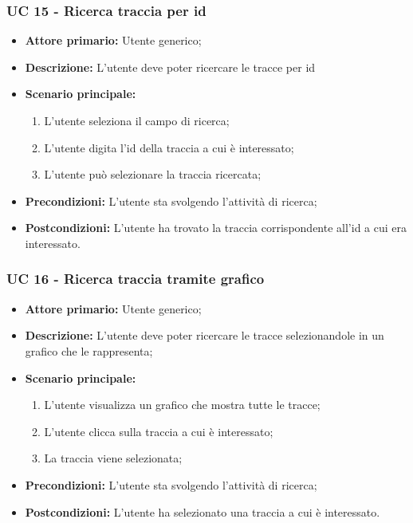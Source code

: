 \subsubsection{UC 15 - Ricerca traccia per id}
\begin{itemize}
	\item \textbf{Attore primario:} Utente generico;
	\item \textbf{Descrizione:} L'utente deve poter ricercare le tracce per id
	\item \textbf{Scenario principale:} 
		\begin{enumerate}
			\item L'utente seleziona il campo di ricerca;
			\item L'utente digita l'id della traccia a cui è interessato;
			\item L'utente può selezionare la traccia ricercata;
		\end{enumerate}
	\item \textbf{Precondizioni:} L'utente sta svolgendo l'attività di ricerca;
	\item \textbf{Postcondizioni:} L'utente ha trovato la traccia corrispondente all'id a cui era interessato.
\end{itemize}

\subsubsection{UC 16 - Ricerca traccia tramite grafico}
\begin{itemize}
	\item \textbf{Attore primario:} Utente generico;
	\item \textbf{Descrizione:} L'utente deve poter ricercare le tracce selezionandole in un grafico che le rappresenta; 
	\item \textbf{Scenario principale:} 
		\begin{enumerate}
			\item L'utente visualizza un grafico che mostra tutte le tracce;
			\item L'utente clicca sulla traccia a cui è interessato;
			\item La traccia viene selezionata;
		\end{enumerate}
	\item \textbf{Precondizioni:} L'utente sta svolgendo l'attività di ricerca;
	\item \textbf{Postcondizioni:} L'utente ha selezionato una traccia a cui è interessato.
\end{itemize}

